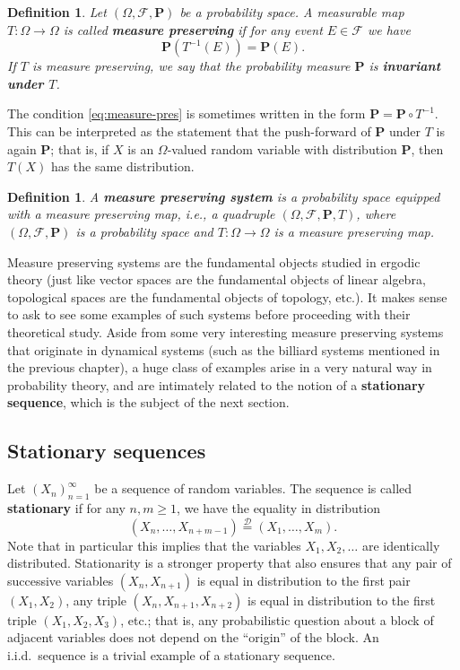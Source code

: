 \documentclass[12pt]{article}
\newtheorem{defi}[thm]{Definition}
\newcommand{\prob}{\mathbf{P}}
\theoremstyle{example}
\begin{document}
\begin{defi}
Let $(\Omega, \mathcal{F}, \prob)$ be a probability space. A measurable map $T:\Omega\to\Omega$ is called \textbf{measure preserving} if for any event $E\in\mathcal{F}$ we have
\begin{equation} \label{eq:measure-pres}
\prob(T^{-1}(E)) = \prob(E).
\end{equation}
If $T$ is measure preserving, we say that the probability measure $\prob$ is \textbf{invariant under $T$}.
\end{defi}

The condition \eqref{eq:measure-pres} is sometimes written in the form $\prob=\prob\circ T^{-1}$. This can be interpreted as the statement that the push-forward of $\prob$ under $T$ is again $\prob$; that is, if $X$ is an $\Omega$-valued random variable with distribution $\prob$, then $T(X)$ has the same distribution.

\begin{defi}
A \textbf{measure preserving system} is a probability space equipped with a measure preserving map, i.e., a quadruple $(\Omega, \mathcal{F}, \prob, T)$, where $(\Omega,\mathcal{F},\prob)$ is a probability space and $T:\Omega\to\Omega$ is a measure preserving map.
\end{defi}

Measure preserving systems are the fundamental objects studied in ergodic theory (just like vector spaces are the fundamental objects of linear algebra, topological spaces are the fundamental objects of topology, etc.). It makes sense to ask to see some examples of such systems before proceeding with their theoretical study. Aside from some very interesting measure preserving systems that originate in dynamical systems (such as the billiard systems mentioned in the previous chapter), a huge class of examples arise in a very natural way in probability theory, and are intimately related to the notion of a \textbf{stationary sequence}, which is the subject of the next section.

\subsection{Stationary sequences} \label{sec-stationary}

Let $(X_n)_{n=1}^\infty$ be a sequence of random variables. The sequence is called \textbf{stationary} if for any $n,m\ge 1$, we have the equality in distribution
\begin{equation} \label{eq:def-stationary}
(X_n,\ldots,X_{n+m-1}) \stackrel{\mathcal{D}}{=} (X_1,\ldots,X_m).
\end{equation}
Note that in particular this implies that the variables $X_1,X_2,\ldots$ are identically distributed. Stationarity is a stronger property that also ensures that any pair of successive variables $(X_n,X_{n+1})$ is equal in distribution to the first pair $(X_1,X_2)$, any triple $(X_n,X_{n+1},X_{n+2})$ is equal in distribution to the first triple $(X_1,X_2,X_3)$, etc.; that is, any probabilistic question about a block of adjacent variables does not depend on the ``origin'' of the block. An i.i.d.\ sequence is a trivial example of a stationary sequence.
\end{document}
